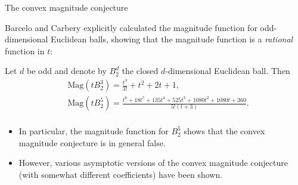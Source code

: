 \documentclass[12pt]{beamer}
\begin{document}
\begin{frame}[allowframebreaks]{The convex magnitude conjecture}
\framebreak

Barcelo and Carbery explicitly calculated the magnitude function for odd-dimensional Euclidean balls, showing that the magnitude function is a \emph{rational} function in $t$:

\begin{theorem}
Let $d$ be odd and denote by $B_2^d$ the closed $d$-dimensional Euclidean ball. Then
\begin{align*}\label{eqn:explicitmagfuns}
&\text{Mag}\left(tB_2^3\right) = \frac{t^3}{3!}+t^2+2t+1, \\
&\text{Mag}\left(tB_2^5\right) = \frac{t^6+18t^5+135t^4+525t^3+1080t^2+1080t+360}{5!(t+3)}. \\
\end{align*}
\end{theorem}

\begin{itemize}
\item In particular, the magnitude function for $B_2^5$ shows that the convex magnitude conjecture is in general false.
\item However, various asymptotic versions of the convex magnitude conjecture (with somewhat different coefficients) have been shown.
\end{itemize}

\end{frame}
\end{document}

